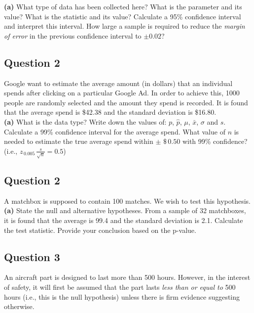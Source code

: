 \documentclass[12pt]{article}
\begin{document}
{\bf(a)} What type of data has been collected here?  What is the parameter and its value?  What is the statistic and its value?  Calculate a 95\% confidence interval and interpret this interval.  How large a sample is required to reduce the \emph{margin of error} in the previous confidence interval to $\pm 0.02$?
	
	
	\subsection*{Question 2}
	Google want to estimate the average amount (in dollars) that an individual spends after clicking on a particular Google Ad. In order to achieve this, 1000 people are randomly selected and the amount they spend is recorded. It is found that the average spend is \$42.38 and the standard deviation is \$16.80.\\[-0.2cm]
	
	
	{\bf(a)} What is the data type?  Write down the values of: $p$, $\hat p$, $\mu$, $\bar x$, $\sigma$ and $s$.  Calculate a 99\% confidence interval for the average spend.  What value of $n$ is needed to estimate the true average spend within $\pm \,\, \$\,0.50$ with 99\% confidence? (i.e., $z_{\,0.005}\,\frac{s}{\sqrt{n}} = 0.5$)

\subsection*{Question 2}
A matchbox is supposed to contain 100 matches. We wish to test this hypothesis.  \\[-0.2cm]

{\bf(a)} State the null and alternative hypotheses.  From a sample of 32 matchboxes, it is found that the average is 99.4 and the standard deviation is 2.1. Calculate the test statistic.  Provide your conclusion based on the p-value.

\subsection*{Question 3}
An aircraft part is designed to last more than 500 hours. However, in the interest of safety, it will first be assumed that the part lasts \emph{less than or equal to} 500 hours (i.e., this is the null hypothesis) unless there is firm evidence suggesting otherwise.\\[-0.2cm]
\end{document}
